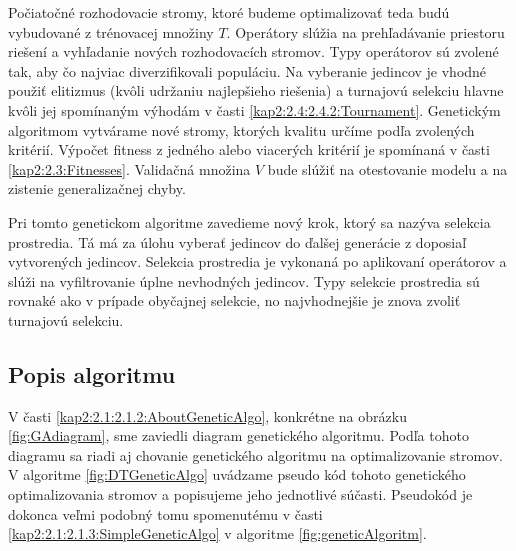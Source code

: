 Počiatočné rozhodovacie stromy, ktoré budeme optimalizovať teda budú vybudované z trénovacej množiny $T$. Operátory slúžia na prehľadávanie priestoru riešení a vyhľadanie nových rozhodovacích stromov. Typy operátorov sú zvolené tak, aby čo najviac diverzifikovali populáciu. Na vyberanie jedincov je vhodné použiť elitizmus (kvôli udržaniu najlepšieho riešenia) a turnajovú selekciu hlavne kvôli jej spomínaným výhodám v časti \ref{kap2:2.4:2.4.2:Tournament}. Genetickým algoritmom vytvárame nové stromy, ktorých kvalitu určíme podľa zvolených kritérií. Výpočet fitness z jedného alebo viacerých kritérií je spomínaná v časti \ref{kap2:2.3:Fitnesses}. Validačná množina $V$ bude slúžiť na otestovanie modelu a na zistenie generalizačnej chyby.

Pri tomto genetickom algoritme zavedieme nový krok, ktorý sa nazýva selekcia prostredia. Tá má za úlohu vyberať jedincov do ďalšej generácie z doposiaľ vytvorených jedincov. Selekcia prostredia je vykonaná po aplikovaní operátorov a slúži na vyfiltrovanie úplne nevhodných jedincov. Typy selekcie prostredia sú rovnaké ako v prípade obyčajnej selekcie, no najvhodnejšie je znova zvoliť turnajovú selekciu.

\subsection{Popis algoritmu}\label{kap3:3.1:3.1.1:AlgoInfo}
V časti \ref{kap2:2.1:2.1.2:AboutGeneticAlgo}, konkrétne na obrázku \ref{fig:GAdiagram}, sme zaviedli diagram genetického algoritmu. Podľa tohoto diagramu sa riadi aj chovanie genetického algoritmu na optimalizovanie stromov.
V algoritme \ref{fig:DTGeneticAlgo} uvádzame pseudo kód tohoto genetického optimalizovania stromov a popisujeme jeho jednotlivé súčasti.
Pseudokód je dokonca veľmi podobný tomu spomenutému v časti \ref{kap2:2.1:2.1.3:SimpleGeneticAlgo} v algoritme \ref{fig:geneticAlgoritm}.

